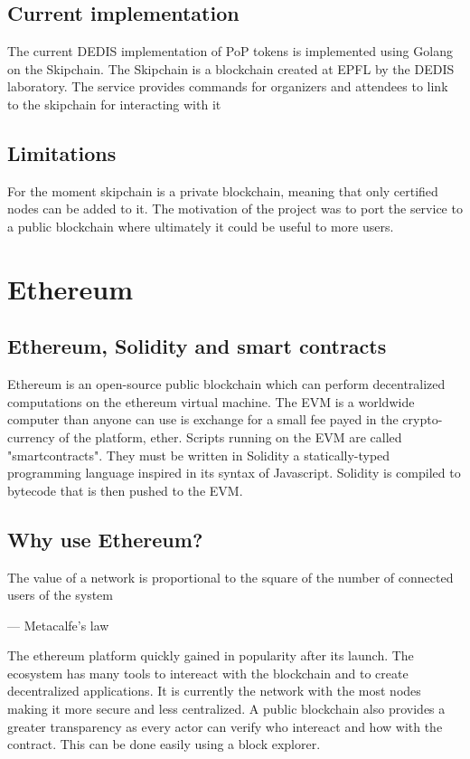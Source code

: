 \documentclass[11pt, a4paper, twoside, openright]{book} %
\begin{document}
\subsection{Current implementation}
The current DEDIS implementation of PoP tokens is implemented using Golang on the Skipchain. The Skipchain is a blockchain created at EPFL by the DEDIS laboratory. The service provides commands for organizers and attendees to link to the skipchain for interacting with it 

\subsection{Limitations}
For the moment skipchain is a private blockchain, meaning that only certified nodes can be added to it. The motivation of the project was to port the service to a public blockchain where ultimately it could be useful to more users. 

\section{Ethereum}

\subsection{Ethereum, Solidity and smart contracts}
 Ethereum is an open-source public blockchain which can perform decentralized computations on the ethereum virtual machine. The EVM is a worldwide computer than anyone can use is exchange for a small fee payed in the crypto-currency of the platform, ether. Scripts running on the EVM are called "smartcontracts". They must be written in Solidity a statically-typed programming language inspired in its syntax of Javascript. Solidity is compiled to bytecode that is then pushed to the EVM. 


\subsection{Why use Ethereum?}

\epigraph{The value of a network is proportional to the square of the number of connected users of the system}
{--- \textup{Metacalfe's law}}

The ethereum platform quickly gained in popularity after its launch. The ecosystem has many tools to intereact with the blockchain and to create decentralized applications. It is currently the network with the most nodes making it more secure and less centralized. A public blockchain also provides a greater transparency as every actor can verify who intereact and how with the contract. This can be done easily using a block explorer. 
\newpage
\end{document}
